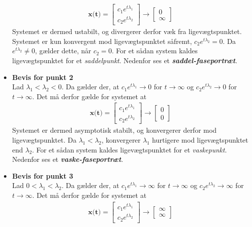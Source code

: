 \begin{bev}
\begin{itemize}
\begin{align*}
        \textbf{x(t)} = \begin{bmatrix} c_1e^{t\lambda_1} \\ c_2e^{t\lambda_2}\end{bmatrix} \to \begin{bmatrix}0 \\ \infty \end{bmatrix}
    \end{align*}
    Systemet er dermed ustabilt, og divergerer derfor væk fra ligevægtspunktet. Systemet er kun konvergent mod ligevægtspunktet såfremt, $c_2e^{t\lambda_2} = 0$. Da $e^{t\lambda_2} \neq 0$, gælder dette, når $c_2 = 0$. For et sådan system kaldes ligevægtspunktet for et \textit{saddelpunkt}. Nedenfor ses et \textbf{\textit{saddel-faseportræt}}.
    \item [] \textbf{Bevis for punkt 2}\\
    Lad $\lambda_1<\lambda_2<0$. Da gælder der, at $c_1e^{t\lambda_1} \to 0$ for $t\to \infty$ og $c_2e^{t\lambda_2} \to 0$ for $t \to \infty$. Det må derfor gælde for systemet at 
    \begin{align*}
        \textbf{x(t)} = \begin{bmatrix} c_1e^{t\lambda_1} \\ c_2e^{t\lambda_2}\end{bmatrix} \to \begin{bmatrix}0 \\ 0 \end{bmatrix}
    \end{align*}
    Systemet er dermed asymptotisk stabilt, og konvergerer derfor mod ligevægtspunktet. 
    Da $\lambda_1<\lambda_2$, konvergerer $\lambda_1$ hurtigere mod ligevægtspunktet end $\lambda_2$.
    For et sådan system kaldes ligevægtspunktet for et \textit{vaskepunkt}. Nedenfor ses et \textbf{\textit{vaske-faseportræt}}.
    \item [] \textbf{Bevis for punkt 3}\\
    Lad $0<\lambda_1<\lambda_2$. Da gælder der, at $c_1e^{t\lambda_1} \to \infty$ for $t\to \infty$ og $c_2e^{t\lambda_2} \to \infty$ for $t \to \infty$. Det må derfor gælde for systemet at 
    \begin{align*}
        \textbf{x(t)} = \begin{bmatrix} c_1e^{t\lambda_1} \\ c_2e^{t\lambda_2}\end{bmatrix} \to \begin{bmatrix} \infty \\ \infty \end{bmatrix}

\end{align*}
\end{itemize}
\end{bev}
